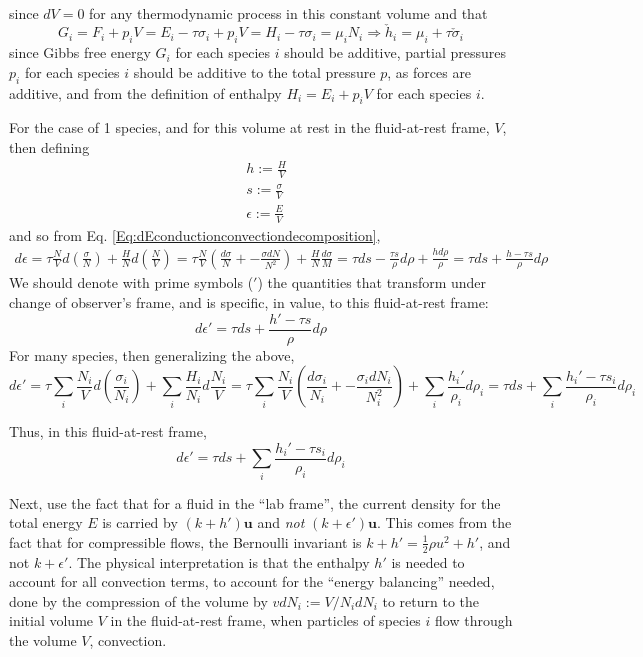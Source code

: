 \documentclass[10pt]{amsart}
\begin{document}
\begin{multicols*}{2}
\begin{enumerate}
\begin{equation}
\begin{gathered}
\end{gathered}
\end{equation}
since $dV=0$ for any thermodynamic process in this constant volume and that
\[
G_i = F_i + p_iV = E_i - \tau \sigma_i + p_i V = H_i - \tau \sigma_i = \mu_i N_i \Longrightarrow \check{h}_i = \mu_i + \tau\check{\sigma}_i
\]
since Gibbs free energy $G_i$ for each species $i$ should be additive, partial pressures $p_i$ for each species $i$ should be additive to the total pressure $p$, as forces are additive, and from the definition of enthalpy $H_i = E_i + p_iV$ for each species $i$.  

For the case of 1 species, and for this volume at rest in the fluid-at-rest frame, $V$, then defining
\[
\begin{aligned}
  & h := \frac{H}{V} \\
  & s := \frac{\sigma}{V} \\
  & \epsilon := \frac{E}{V}
\end{aligned}
\]
and so from Eq. \ref{Eq:dEconductionconvectiondecomposition},
\[
\begin{gathered}
  d\epsilon  = \tau \frac{N}{V} d\left( \frac{\sigma}{N} \right) + \frac{H}{N} d\left( \frac{N}{V} \right) = \tau \frac{N}{V} \left( \frac{d\sigma}{N} + -\frac{ \sigma dN}{ N^2 } \right) + \frac{H}{N} \frac{d\sigma}{M} = \tau ds - \frac{\tau s}{\rho} d\rho + \frac{h d\rho}{\rho} = \tau ds + \frac{h-\tau s}{ \rho} d\rho 
\end{gathered}
\]
We should denote with prime symbols ($'$) the quantities that transform under change of observer's frame, and is specific, in value, to this fluid-at-rest frame:
\[
d\epsilon' = \tau ds + \frac{h'-\tau s}{\rho} d\rho
\]
For many species, then generalizing the above,
\[
d\epsilon' = \tau \sum_i \frac{N_i}{V} d\left( \frac{\sigma_i}{N_i} \right) + \sum_i \frac{H_i}{N_i}d\frac{N_i}{V} = \tau \sum_i \frac{N_i}{V} \left( \frac{d\sigma_i}{N_i} + - \frac{\sigma_i dN_i}{N_i^2} \right) + \sum_i \frac{h_i'}{\rho_i}d\rho_i = \tau ds + \sum_i \frac{ h_i' - \tau s_i }{\rho_i} d\rho_i 
\]

Thus, in this fluid-at-rest frame,
\begin{equation}\label{Eq:internalenergyfluidatrest}
  \boxed{ d\epsilon' = \tau ds + \sum_i \frac{h_i'-\tau s_i}{\rho_i} d\rho_i}
\end{equation}

Next, use the fact that for a fluid in the ``lab frame'', the current density for the total energy $E$ is carried by $(k+h')\mathbf{u}$ and \emph{not} $(k+\epsilon')\mathbf{u}$.  This comes from the fact that for compressible flows, the Bernoulli invariant is $k+h' = \frac{1}{2} \rho u^2 + h'$, and not $k+\epsilon'$.  The physical interpretation is that the enthalpy $h'$ is needed to account for all convection terms, to account for the ``energy balancing'' needed, done by the compression of the volume by $vdN_i := V/N_i dN_i$ to return to the initial volume $V$ in the fluid-at-rest frame, when particles of species $i$ flow through the volume $V$, convection.  


\end{enumerate}
\end{multicols*}
\end{document}
